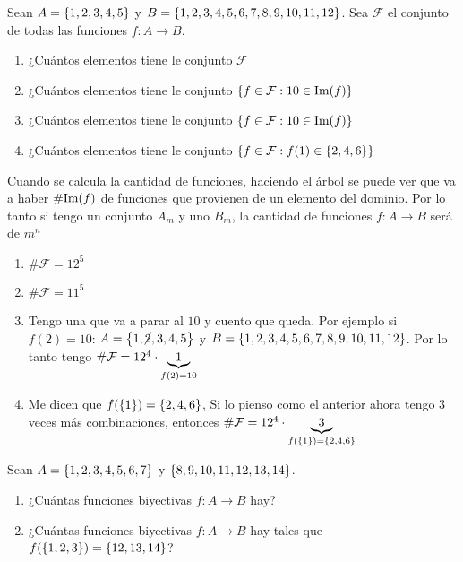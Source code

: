 \documentclass[12pt,a4paper, spanish]{article}
\begin{document}
\ejercicio
Sean $A = \left\{ 1,2,3,4,5 \right\}$ y $B = \left\{ 1,2,3,4,5,6,7,8,9,10,11,12 \right\}$. Sea $\mathcal F$ el conjunto de todas las funciones
$f: A \to B$.
\begin{enumerate}[label=\roman*)]
	\item  ¿Cuántos elementos tiene le conjunto $\mathcal F$
	\item  ¿Cuántos elementos tiene le conjunto $\left\{ f \in \mathcal F : 10 \in \text{Im}(f)  \right\}$
	\item  ¿Cuántos elementos tiene le conjunto $\left\{ f \in \mathcal F : 10 \in \text{Im}(f) \right\}$
	\item  ¿Cuántos elementos tiene le conjunto $\left\{ f \in \mathcal F : f(1) \in \left\{ 2,4,6 \right\}  \right\}$
\end{enumerate}

\separadorCorto

Cuando se calcula la cantidad de funciones, haciendo el árbol se puede ver que va a haber $\#\text{Im}(f)$ de funciones que provienen
de un elemento del dominio. Por lo tanto si tengo un conjunto $A_m$ y uno $B_m$, la cantidad de funciones $f : A \to B$ será
de $m^n$\\

\begin{enumerate}[label=\roman*)]
	\item $\# \mathcal F = 12^5$

	\item $\# \mathcal F = 11^5$

	\item Tengo una que va a parar al $10$ y cuento que queda. Por ejemplo si $f(2) = 10$: $A = \left\{ 1,\cancel{2},3,4,5 \right\}$ y $B = \left\{ 1,2,3,4,5,6,7,8,9,10,11,12 \right\}$.
	      Por lo tanto tengo $\# \mathcal F = 12^4 \cdot \underbrace{\normalsize 1}_{f (2) = 10}$\\

	\item Me dicen que $f(\left\{ 1 \right\}) = \left\{ 2,4,6 \right\}$,
	      Si lo pienso como el anterior ahora tengo 3 veces más combinaciones, entonces
	      $\# \mathcal F = 12^4 \cdot \underbrace{\tiny 3}_{ f (\left\{ 1 \right\})= \left\{ 2,4,6 \right\}}$
\end{enumerate}

\ejercicio
Sean $A = \left\{ 1,2,3,4,5,6,7 \right\}$ y $\left\{ 8,9,10,11,12,13,14 \right\}$.
\begin{enumerate}[label=\roman*)]
	\item ¿Cuántas funciones biyectivas $f: A \to B$ hay?
	\item ¿Cuántas funciones biyectivas $f: A \to B$ hay tales que $f(\left\{ 1,2,3 \right\}) = \left\{ 12,13,14 \right\}$?
\end{enumerate}
\end{document}
